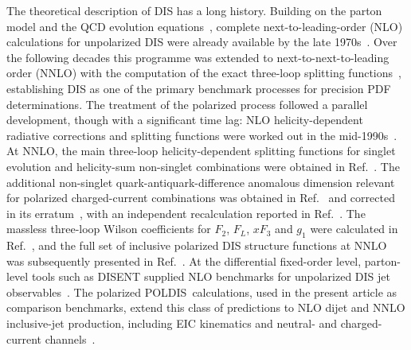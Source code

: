 \documentclass[a4paper,11pt]{article}
\newcommand{\POLDIS}{\textsc{POLDIS}}
\begin{document}
The theoretical description of DIS has a long history. Building on the parton model and the QCD evolution equations~\cite{Altarelli:1977zs}, complete next-to-leading-order (NLO) calculations for unpolarized DIS were already available by the late 1970s~\cite{Bardeen:1978yd}. Over the following decades this programme was extended to next-to-next-to-leading order (NNLO) with the computation of the exact three-loop splitting functions~\cite{Moch:2004pa,Vogt:2004mw}, establishing DIS as one of the primary benchmark processes for precision PDF determinations. The treatment of the polarized process followed a parallel development, though with a significant time lag: NLO helicity-dependent radiative corrections and splitting functions were worked out in the mid-1990s~\cite{Zijlstra:1993sh,Mertig:1995ny,Vogelsang:1996im}. At NNLO, the main three-loop helicity-dependent splitting functions for singlet evolution and helicity-sum non-singlet combinations were obtained in Ref.~\cite{Moch:2014sna}. The additional non-singlet quark-antiquark-difference anomalous dimension relevant for polarized charged-current combinations was obtained in Ref.~\cite{Blumlein:2021enk} and corrected in its erratum~\cite{Blumlein:2026erratum}, with an independent recalculation reported in Ref.~\cite{Behring:2025avs}. The massless three-loop Wilson coefficients for $F_2$, $F_L$, $xF_3$ and $g_1$ were calculated in Ref.~\cite{Blumlein:2022gpp}, and the full set of inclusive polarized DIS structure functions at NNLO was subsequently presented in Ref.~\cite{Borsa:2022irn}. At the differential fixed-order level, parton-level tools such as \textsc{DISENT} supplied NLO benchmarks for unpolarized DIS jet observables~\cite{Catani:1996vz}. The polarized \POLDIS\ calculations, used in the present article as comparison benchmarks, extend this class of predictions to NLO dijet and NNLO inclusive-jet production, including EIC kinematics and neutral- and charged-current channels~\cite{Borsa:2020polarizedjets,Borsa:2022nnlojets}.
\end{document}
